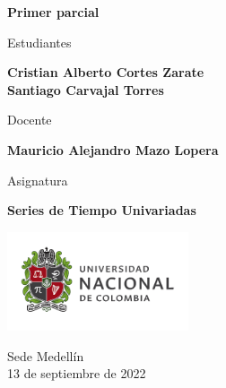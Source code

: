 \begin{titlepage}
   \Large{
   \begin{center}
       \vspace*{1cm}

       \textbf{Primer parcial}

            
       \vspace{1.5cm}
       
       Estudiantes
       
       \vspace{0.5cm}
        
	\textbf{Cristian Alberto Cortes Zarate}\\        


	\textbf{Santiago Carvajal Torres}

              \vspace{1cm}
       
       Docente
       
       \vspace{0.5cm}

       \textbf{Mauricio Alejandro Mazo Lopera}
       
       \vspace{0.4cm}

       \vspace{1.4cm}
       
       Asignatura
       
       \vspace{0.5cm}

       \textbf{Series de Tiempo Univariadas}

       \vfill

            
       \vspace{0.4cm}
     
       \includegraphics[width=0.4\textwidth]{logounal.png}
            
       Sede Medellín\\
       13 de septiembre de 2022
       
   \end{center}
   }
\end{titlepage}